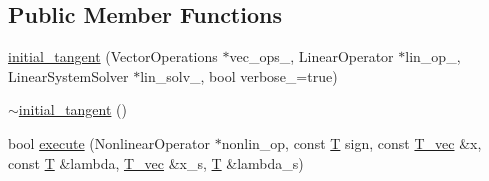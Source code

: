 \subsection*{Public Member Functions}
\begin{DoxyCompactItemize}
\item 
\hyperlink{classcontinuation_1_1initial__tangent_a01a0a498b5240579756f64bd88ab7b6a}{initial\-\_\-tangent} (Vector\-Operations $\ast$vec\-\_\-ops\-\_\-, Linear\-Operator $\ast$lin\-\_\-op\-\_\-, Linear\-System\-Solver $\ast$lin\-\_\-solv\-\_\-, bool verbose\-\_\-=true)
\item 
\hyperlink{classcontinuation_1_1initial__tangent_a1ee52c77551530dd5379165b8b181dbf}{$\sim$initial\-\_\-tangent} ()
\item 
bool \hyperlink{classcontinuation_1_1initial__tangent_a5b6636a85799a215769ec5a047278f80}{execute} (Nonlinear\-Operator $\ast$nonlin\-\_\-op, const \hyperlink{classcontinuation_1_1initial__tangent_a39f8fc77c4f6d3de481cd8550bb3e768}{T} sign, const \hyperlink{classcontinuation_1_1initial__tangent_ad348e9e404ffd58ae936cfae5cddc928}{T\-\_\-vec} \&x, const \hyperlink{classcontinuation_1_1initial__tangent_a39f8fc77c4f6d3de481cd8550bb3e768}{T} \&lambda, \hyperlink{classcontinuation_1_1initial__tangent_ad348e9e404ffd58ae936cfae5cddc928}{T\-\_\-vec} \&x\-\_\-s, \hyperlink{classcontinuation_1_1initial__tangent_a39f8fc77c4f6d3de481cd8550bb3e768}{T} \&lambda\-\_\-s)
\end{DoxyCompactItemize}


